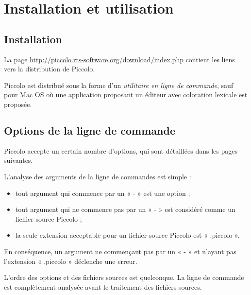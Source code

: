 
\cleardoublepage

\chapter{Installation et utilisation}

\thispagestyle{empty}


\section{Installation}

La page \url{http://piccolo.rts-software.org/download/index.php} contient les liens vers la distribution de Piccolo. 

Piccolo est distribué sous la forme d'un \emph{utilitaire en ligne de commande}, sauf pour Mac OS où une application proposant un éditeur avec coloration lexicale est proposée.





\section{Options de la ligne de commande}


Piccolo accepte un certain nombre d’options, qui sont détaillées dans les pages suivantes.

L’analyse des arguments de la ligne de commandes est simple :
\begin{itemize}
  \item tout argument qui commence par un « - » est une option ;
  \item tout argument qui ne commence pas par un « - » est considéré comme un fichier source Piccolo ;
  \item la seule extension acceptable pour un fichier source Piccolo est « .piccolo ».
\end{itemize}

En conséquence, un argument ne commençant pas par un « - » et n’ayant pas l’extension « .piccolo » déclenche une erreur.

L’ordre des options et des fichiers sources est quelconque. La ligne de commande est complètement analysée avant le traitement des fichiers sources.

